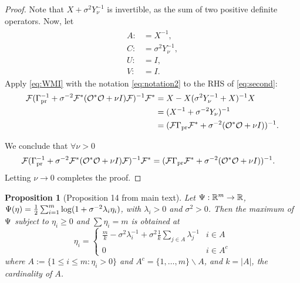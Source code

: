 \documentclass{article}
\newtheorem{proposition}{Proposition}
\begin{document}
\begin{proof}
   Note that $X + \sigma^2 Y_{\nu}^{-1}$ is invertible, as the sum of
   two positive definite operators. Now, let
   \begin{align}\label{eq:notation2}
     \begin{split}
       A :&= X^{-1}, \\
       C :&= \sigma^2Y_{\nu}^{-1}, \\
       U :&= I, \\
       V :&= I.
     \end{split}
   \end{align}
   Apply \eqref{eq:WMI} with the notation \eqref{eq:notation2} to the
   RHS of \eqref{eq:second}:
  \begin{align*}
    \begin{split}
      \mathcal{F}( \Gamma_{\textup{pr}}^{-1} + \sigma^{-2}  \mathcal{F}^* (\mathcal{O}^* \mathcal{O} +\nu I) \mathcal{F} )^{-1}\mathcal{F}^* &= X - X(\sigma^2Y_{\nu}^{-1} + X)^{-1}X \\
      &= (X^{-1} + \sigma^{-2}Y_{\nu})^{-1} \\
      &= (\mathcal{F} \Gamma_{\textup{pr}} \mathcal{F}^* + \sigma^{-2} (\mathcal{O}^*\mathcal{O} + \nu I))^{-1}.
    \end{split}
  \end{align*}

  We conclude that $\forall \nu > 0$
  \begin{align*}
    \begin{split}
      \mathcal{F}( \Gamma_{\textup{pr}}^{-1} + \sigma^{-2}  \mathcal{F}^* (\mathcal{O}^* \mathcal{O} +\nu I) \mathcal{F} )^{-1}\mathcal{F}^* 
     &= (\mathcal{F} \Gamma_{\textup{pr}} \mathcal{F}^* + \sigma^{-2} (\mathcal{O}^*\mathcal{O} + \nu I))^{-1}.
    \end{split}
  \end{align*}
  Letting $\nu \to 0$ completes the proof.
\end{proof}












\begin{proposition}[Proposition 14 from main text]
  Let $\Psi: \mathbb{R}^m \to \mathbb{R}$, $\Psi(\eta) =
  \frac{1}{2}\sum_{i=1}^m \log (1+\sigma^{-2}\lambda_i \eta_i)$, with
  $\lambda_i > 0$ and $\sigma^{2} > 0$. Then the maximum of $\Psi$
  subject to $\eta_i \geq 0$ and $\sum\eta_i = m$ is obtained at
  \begin{equation}
  \eta_i = \begin{cases}
    \frac{m}{k} - \sigma^2 \lambda_i^{-1} + \sigma^2 \frac{1}{k} \sum_{j\in A} \lambda_j^{-1} & i \in A \\
    0 & i \in A^c
  \end{cases}
  \end{equation}
  where $A:= \{1\leq i \leq m: \eta_i > 0\}$ and $A^c = \{1,\dots, m\}
  \backslash A$, and $k = |A|$, the cardinality of $A$.
\end{proposition}
\end{document}
